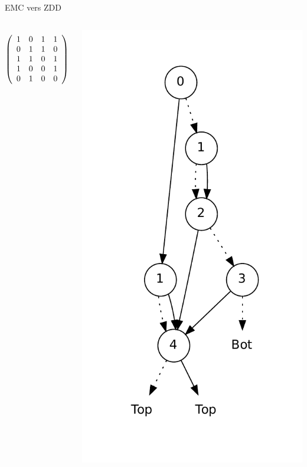 \documentclass{beamer}
\begin{document}
\begin{frame}{EMC vers ZDD}
  \begin{columns}

  \begin{displaymath}
   \left(\begin{array}{ c c c c c }
   1 & 0 & 1 & 1 \\
   0 & 1 & 1 & 0 \\
   1 & 1 & 0 & 1 \\
   1 & 0 & 0 & 1 \\
   0 & 1 & 0 & 0
  \end{array}\right)
  \end{displaymath}

    \includegraphics[height=0.9\textheight]{../imports/column.pdf}
  \end{columns}
\end{frame}
\end{document}
